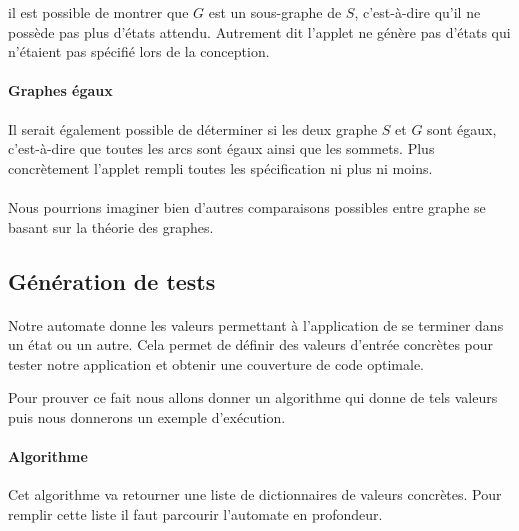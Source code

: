 il est possible de montrer que $G$ est un sous-graphe de $S$, c'est-à-dire 
qu'il ne possède pas plus d'états attendu. Autrement dit l'applet ne génère 
pas d'états qui n'étaient pas spécifié lors de la conception.

\paragraph{Graphes égaux}
Il serait également possible de déterminer si les deux graphe $S$ et $G$ sont 
égaux, c'est-à-dire que toutes les arcs sont égaux ainsi que les sommets. Plus 
concrètement l'applet rempli toutes les spécification ni plus ni moins.

\paragraph{}
Nous pourrions imaginer bien d'autres comparaisons possibles entre graphe se 
basant sur la théorie des graphes.

\subsection{Génération de tests}

\paragraph{}
Notre automate donne les valeurs permettant à l'application de se terminer 
dans un état ou un autre. Cela permet de définir des valeurs d'entrée concrètes 
pour tester notre application et obtenir une couverture de code optimale.


Pour prouver ce fait nous allons donner un algorithme qui donne de tels 
valeurs puis nous donnerons un exemple d'exécution. 

\paragraph{Algorithme}
Cet algorithme va retourner une liste de dictionnaires de valeurs concrètes. 
Pour remplir cette liste il faut parcourir l'automate en profondeur.

